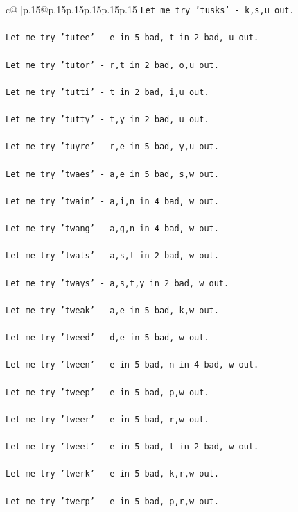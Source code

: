 \documentclass{article}
\begin{document}
{\begin{supertabular}{c@{$\;$}|p{.15\linewidth}@{}p{.15\linewidth}p{.15\linewidth}p{.15\linewidth}p{.15\linewidth}p{.15\linewidth}}
{{{\texttt{Let me try 'tusks' {-} k,s,u out. } \\
\\ 
\texttt{Let me try 'tutee' {-} e in 5 bad, t in 2 bad, u out. } \\
\\ 
\texttt{Let me try 'tutor' {-} r,t in 2 bad, o,u out. } \\
\\ 
\texttt{Let me try 'tutti' {-} t in 2 bad, i,u out. } \\
\\ 
\texttt{Let me try 'tutty' {-} t,y in 2 bad, u out. } \\
\\ 
\texttt{Let me try 'tuyre' {-} r,e in 5 bad, y,u out. } \\
\\ 
\texttt{Let me try 'twaes' {-} a,e in 5 bad, s,w out. } \\
\\ 
\texttt{Let me try 'twain' {-} a,i,n in 4 bad, w out. } \\
\\ 
\texttt{Let me try 'twang' {-} a,g,n in 4 bad, w out. } \\
\\ 
\texttt{Let me try 'twats' {-} a,s,t in 2 bad, w out. } \\
\\ 
\texttt{Let me try 'tways' {-} a,s,t,y in 2 bad, w out. } \\
\\ 
\texttt{Let me try 'tweak' {-} a,e in 5 bad, k,w out. } \\
\\ 
\texttt{Let me try 'tweed' {-} d,e in 5 bad, w out. } \\
\\ 
\texttt{Let me try 'tween' {-} e in 5 bad, n in 4 bad, w out. } \\
\\ 
\texttt{Let me try 'tweep' {-} e in 5 bad, p,w out. } \\
\\ 
\texttt{Let me try 'tweer' {-} e in 5 bad, r,w out. } \\
\\ 
\texttt{Let me try 'tweet' {-} e in 5 bad, t in 2 bad, w out. } \\
\\ 
\texttt{Let me try 'twerk' {-} e in 5 bad, k,r,w out. } \\
\\ 
\texttt{Let me try 'twerp' {-} e in 5 bad, p,r,w out. } \\
}}}
\end{supertabular}}
\end{document}
